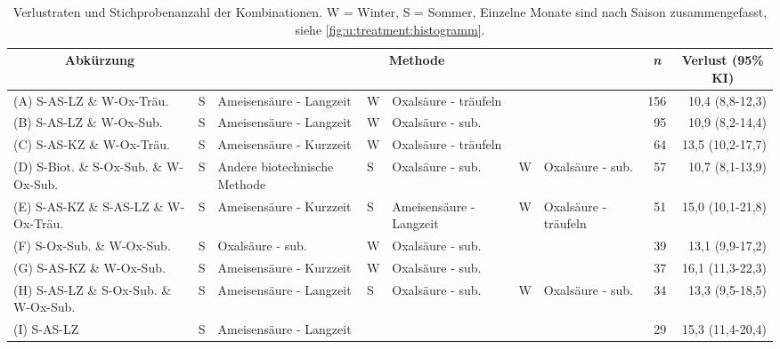 \newpage
\begin{landscape}

\begin{table}[H]
    \centering
    \caption{Verlustraten und Stichprobenanzahl der Kombinationen. W = Winter, S = Sommer, Einzelne Monate sind nach Saison zusammengefasst, siehe \cref{fig:u:treatment:histogramm}.}
    \scriptsize
    \setlength{\tabcolsep}{0.5em} %
    \label{tab:u:kombinationen}
    \begin{tabular}{l|*{6}{l}|rr}
            \multicolumn{1}{c|}{Abkürzung} & 
            \multicolumn{6}{c|}{Methode} & 
            \multicolumn{1}{c}{\textit{n}} &
            \multicolumn{1}{c}{Verlust (95\% KI)}
            \\
        \hline
        (A) S-AS-LZ   \& W-Ox-Träu.             & S & Ameisensäure - Langzeit       & W & Oxalsäure - träufeln      &   &                       & 156 & 10,4 (8,8-12,3) \\
        (B) S-AS-LZ   \& W-Ox-Sub.              & S & Ameisensäure - Langzeit       & W & Oxalsäure - sub.          &   &                       &  95 & 10,9 (8,2-14,4) \\
        (C) S-AS-KZ   \& W-Ox-Träu.             & S & Ameisensäure - Kurzzeit       & W & Oxalsäure - träufeln      &   &                       &  64 & 13,5 (10,2-17,7) \\
        (D) S-Biot.   \& S-Ox-Sub. \& W-Ox-Sub. & S & Andere biotechnische Methode  & S & Oxalsäure - sub.          & W & Oxalsäure - sub.      &  57 & 10,7 (8,1-13,9) \\
        (E) S-AS-KZ   \& S-AS-LZ \& W-Ox-Träu.  & S & Ameisensäure - Kurzzeit       & S & Ameisensäure - Langzeit   & W & Oxalsäure - träufeln  &  51 & 15,0 (10,1-21,8) \\
        (F) S-Ox-Sub. \& W-Ox-Sub.              & S & Oxalsäure - sub.              & W & Oxalsäure - sub.          &   &                       &  39 & 13,1 (9,9-17,2) \\
        (G) S-AS-KZ   \& W-Ox-Sub.              & S & Ameisensäure - Kurzzeit       & W & Oxalsäure - sub.          &   &                       &  37 & 16,1 (11,3-22,3) \\
        (H) S-AS-LZ   \& S-Ox-Sub. \& W-Ox-Sub. & S & Ameisensäure - Langzeit       & S & Oxalsäure - sub.          & W & Oxalsäure - sub.      &  34 & 13,3 (9,5-18,5) \\
        (I) S-AS-LZ                             & S & Ameisensäure - Langzeit       &   &                           &   &                       &  29 & 15,3 (11,4-20,4) \\

\end{tabular}
\end{table}
\end{landscape}
